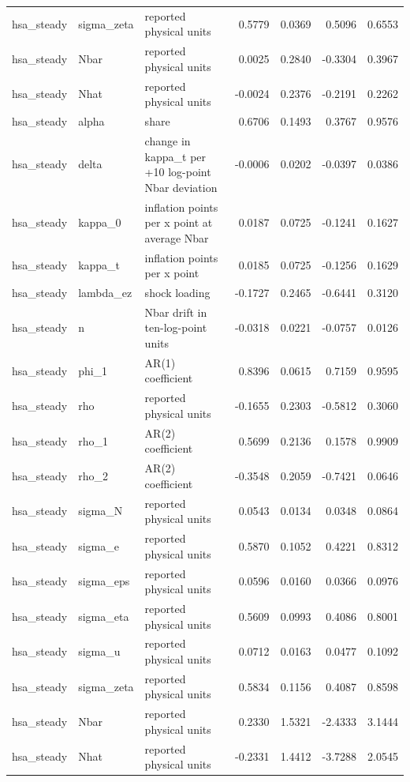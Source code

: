 \begin{tabular}{lllrrrr}
hsa\_steady & sigma\_zeta & reported physical units & 0.5779 & 0.0369 & 0.5096 & 0.6553 \\
hsa\_steady & Nbar & reported physical units & 0.0025 & 0.2840 & -0.3304 & 0.3967 \\
hsa\_steady & Nhat & reported physical units & -0.0024 & 0.2376 & -0.2191 & 0.2262 \\
hsa\_steady & alpha & share & 0.6706 & 0.1493 & 0.3767 & 0.9576 \\
hsa\_steady & delta & change in kappa\_t per +10 log-point Nbar deviation & -0.0006 & 0.0202 & -0.0397 & 0.0386 \\
hsa\_steady & kappa\_0 & inflation points per x point at average Nbar & 0.0187 & 0.0725 & -0.1241 & 0.1627 \\
hsa\_steady & kappa\_t & inflation points per x point & 0.0185 & 0.0725 & -0.1256 & 0.1629 \\
hsa\_steady & lambda\_ez & shock loading & -0.1727 & 0.2465 & -0.6441 & 0.3120 \\
hsa\_steady & n & Nbar drift in ten-log-point units & -0.0318 & 0.0221 & -0.0757 & 0.0126 \\
hsa\_steady & phi\_1 & AR(1) coefficient & 0.8396 & 0.0615 & 0.7159 & 0.9595 \\
hsa\_steady & rho & reported physical units & -0.1655 & 0.2303 & -0.5812 & 0.3060 \\
hsa\_steady & rho\_1 & AR(2) coefficient & 0.5699 & 0.2136 & 0.1578 & 0.9909 \\
hsa\_steady & rho\_2 & AR(2) coefficient & -0.3548 & 0.2059 & -0.7421 & 0.0646 \\
hsa\_steady & sigma\_N & reported physical units & 0.0543 & 0.0134 & 0.0348 & 0.0864 \\
hsa\_steady & sigma\_e & reported physical units & 0.5870 & 0.1052 & 0.4221 & 0.8312 \\
hsa\_steady & sigma\_eps & reported physical units & 0.0596 & 0.0160 & 0.0366 & 0.0976 \\
hsa\_steady & sigma\_eta & reported physical units & 0.5609 & 0.0993 & 0.4086 & 0.8001 \\
hsa\_steady & sigma\_u & reported physical units & 0.0712 & 0.0163 & 0.0477 & 0.1092 \\
hsa\_steady & sigma\_zeta & reported physical units & 0.5834 & 0.1156 & 0.4087 & 0.8598 \\
hsa\_steady & Nbar & reported physical units & 0.2330 & 1.5321 & -2.4333 & 3.1444 \\
hsa\_steady & Nhat & reported physical units & -0.2331 & 1.4412 & -3.7288 & 2.0545 \\

\end{tabular}

